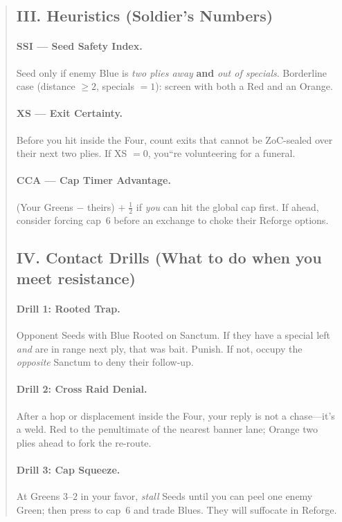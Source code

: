 \documentclass[11pt]{article}
\begin{document}
\begin{quote}
\subsection{III. Heuristics (Soldier's Numbers)}
\paragraph{SSI --- Seed Safety Index.} Seed only if enemy Blue is \emph{two plies away} \textbf{and} \emph{out of specials}. Borderline case (distance $\ge 2$, specials $=1$): screen with both a Red and an Orange.
\paragraph{XS --- Exit Certainty.} Before you hit inside the Four, count exits that cannot be ZoC-sealed over their next two plies. If XS $=0$, you``re volunteering for a funeral.
\paragraph{CCA --- Cap Timer  Advantage.} (Your Greens $-$ theirs) $+\;\tfrac{1}{2}$ if \emph{you} can hit the global cap first. If ahead, consider forcing cap~6 before an exchange to choke their Reforge options.

\subsection{IV. Contact Drills (What to do when you meet resistance)}
\paragraph{Drill 1: Rooted Trap.} Opponent Seeds with Blue Rooted on Sanctum. If they have a special left \emph{and} are in range next ply, that was bait. Punish. If not, occupy the \emph{opposite} Sanctum to deny their follow-up.
\paragraph{Drill 2: Cross Raid Denial.} After a hop or displacement inside the Four, your reply is not a chase---it's a weld. Red to the penultimate of the nearest banner lane; Orange two plies ahead to fork the re-route.
\paragraph{Drill 3: Cap Squeeze.} At Greens $3$--$2$ in your favor, \emph{stall} Seeds until you can peel one enemy Green; then press to cap~6 and trade Blues. They will suffocate in Reforge.


\end{quote}
\end{document}
